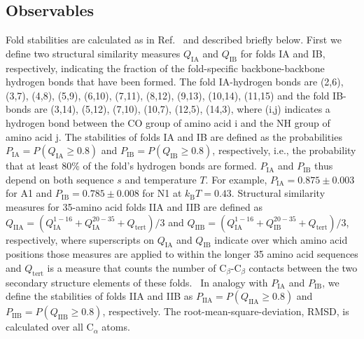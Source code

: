 \documentclass[
aip,
rsi,%
amsmath,amssymb,
reprint,%
]{revtex4-1}
\newcommand	 {\sbar}	{{s}}
\newcommand	 {\kb}		{{k_\mathrm{B}}}
\newcommand {\QIA}	{{Q_\mathrm{IA}}}
\newcommand {\QIB}	{{Q_\mathrm{IB}}}
\newcommand {\QIIA}	{{Q_\mathrm{IIA}}}
\newcommand {\QIIB}	{{Q_\mathrm{IIB}}}
\newcommand {\PIA}    	{{P_\mathrm{IA}}}
\newcommand {\PIB}    	{{P_\mathrm{IB}}}
\newcommand {\PIIA}    	{{P_\mathrm{IIA}}}
\newcommand {\PIIB}    	{{P_\mathrm{IIB}}}
\begin{document}
\subsection{Observables}
\noindent
Fold stabilities are calculated as in Ref.~ and described briefly below. First we define two structural similarity measures $\QIA$ and $\QIB$ for folds IA and IB, respectively, indicating the fraction of the fold-specific backbone-backbone hydrogen bonds that have been formed. The fold IA-hydrogen bonds are (2,6), (3,7), (4,8), (5,9), (6,10), (7,11), (8,12), (9,13), (10,14), (11,15) and the fold IB-bonds are (3,14), (5,12), (7,10), (10,7), (12,5), (14,3), where (i,j) indicates a hydrogen bond between the CO group of amino acid i and the NH group of amino acid j. The stabilities of folds IA and IB are defined as the probabilities $\PIA = P(\QIA\ge0.8)$ and $\PIB = P(\QIB\ge0.8)$, respectively, i.e., the probability that at least 80\% of the fold's hydrogen bonds are formed. $\PIA$ and $\PIB$ thus depend on both sequence $\sbar$ and temperature $T$. For example, $\PIA=0.875\pm 0.003$ for A1 and $\PIB=0.785\pm0.008$ for N1 at $\kb T = 0.43$. Structural similarity measures for 35-amino acid folds IIA and IIB are defined as $\QIIA = ( Q_\mathrm{IA}^\mathrm{1-16} + Q_\mathrm{IA}^\mathrm{20-35} + Q_\mathrm{tert} ) / 3$ and $\QIIB = ( Q_\mathrm{IA}^\mathrm{1-16} + Q_\mathrm{IB}^\mathrm{20-35} + Q_\mathrm{tert} ) / 3$, respectively, where superscripts on $\QIA$ and $\QIB$ indicate over which amino acid positions those measures are applied to within the longer 35 amino acid sequences and $Q_\mathrm{tert}$ is a measure that counts the number of $\mathrm{C}_\beta$-$\mathrm{C}_\beta$ contacts between the two secondary structure elements of these folds.~\cite{Holzgrafe2015} In analogy with $\PIA$ and $\PIB$, we define the stabilities of folds IIA and IIB as $\PIIA = P(\QIIA\ge0.8)$ and $\PIIB = P(\QIIB\ge0.8)$, respectively. The root-mean-square-deviation, RMSD, is calculated over all $\mathrm{C}_\alpha$ atoms.
\end{document}

